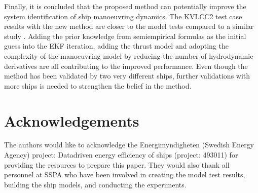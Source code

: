 \documentclass[review]{elsarticle}
\begin{document}
\sphinxAtStartPar
Finally, it is concluded that the proposed method can potentially improve the system identification of ship manoeuvring dynamics. The KVLCC2 test case results with the new method are closer to the model tests compared to a similar study \cite{he_nonparametric_2022}. Adding the prior knowledge from semi\sphinxhyphen{}empirical formulas as the initial guess into the EKF iteration, adding the thrust model and adopting the complexity of the manoeuvring model by reducing the number of hydrodynamic derivatives are all contributing to the improved performance.
Even though the method has been validated by two very different ships, further validations with more ships is needed to strengthen the belief in the method.


\section{Acknowledgements}
\label{\detokenize{acknowledgements:acknowledgements}}\label{\detokenize{acknowledgements::doc}}
\sphinxAtStartPar
The authors would like to acknowledge the Energimyndigheten (Swedish Energy Agency) project: Data\sphinxhyphen{}driven energy efficiency of ships (project: 49301\sphinxhyphen{}1) for providing the resources to prepare this paper. They would also thank all personnel at SSPA who have been involved in creating the model test results, building the ship models, and conducting the experiments.
\label{\detokenize{bibligraphy:id1}}







\renewcommand{\indexname}{Index}


\end{document}
